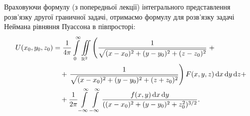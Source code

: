 Враховуючи формулу  (з попередньої лекції) інтегрального представлення розв'язку другої граничної задачі, отримаємо формулу для розв'язку задачі Неймана рівняння Пуассона в півпросторі:
\begin{equation}
	\begin{aligned}
		U(x_0, y_0, z_0) &= \frac{1}{4 \pi} \displaystyle\int\limits_0^\infty \displaystyle\iint\limits_{\mathbb{R}^2} \left( \frac{1}{\sqrt{(x - x_0)^2 + (y - y_0)^2 + (z - z_0)^2}} \right. + \\
		& \quad + \left. \frac{1}{\sqrt{(x - x_0)^2 + (y - y_0)^2 + (z + z_0)^2}} \right) F(x, y, z) \mathop{}\!\mathrm{d} x \mathop{}\!\mathrm{d} y \mathop{}\!\mathrm{d} z + \\
		& \quad + \frac{1}{2 \pi} \displaystyle\int\limits_{-\infty}^\infty \displaystyle\int\limits_{-\infty}^\infty \frac{f(x, y) \mathop{}\!\mathrm{d} x \mathop{}\!\mathrm{d} y}{((x - x_0)^2 + (y - y_0)^2 + z_0^2)^{3/2}}.
	\end{aligned}
\end{equation}